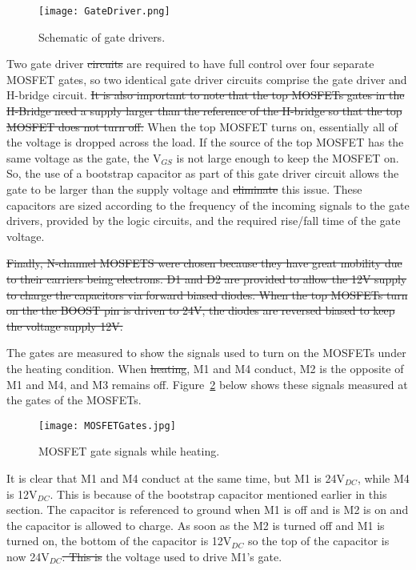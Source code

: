 \documentclass[11pt,letter]{article}
\providecommand{\DIFadd}[1]{{\protect\color{blue}\uwave{#1}}} %
\providecommand{\DIFdel}[1]{{\protect\color{red}\sout{#1}}}                      %
\providecommand{\DIFaddbegin}{} %
\providecommand{\DIFaddend}{} %
\providecommand{\DIFdelbegin}{} %
\providecommand{\DIFdelend}{} %
\newcommand{\DIFscaledelfig}{0.5}
\newlength{\DIFdelgraphicswidth} %
\newlength{\DIFdelgraphicsheight} %
\newcommand{\DIFaddincludegraphics}[2][]{{\color{blue}\fbox{\DIFOincludegraphics[#1]{#2}}}} %
\newcommand{\DIFdelincludegraphics}[2][]{%
\sbox{\DIFdelgraphicsbox}{\DIFOincludegraphics[#1]{#2}}%
\settoboxwidth{\DIFdelgraphicswidth}{\DIFdelgraphicsbox} %
\settoboxtotalheight{\DIFdelgraphicsheight}{\DIFdelgraphicsbox} %
\scalebox{\DIFscaledelfig}{%
\parbox[b]{\DIFdelgraphicswidth}{\usebox{\DIFdelgraphicsbox}\\[-\baselineskip] \rule{\DIFdelgraphicswidth}{0em}}\llap{\resizebox{\DIFdelgraphicswidth}{\DIFdelgraphicsheight}{%
\setlength{\unitlength}{\DIFdelgraphicswidth}%
\begin{picture}(1,1)%
\thicklines\linethickness{2pt} %
{\color[rgb]{1,0,0}\put(0,0){\framebox(1,1){}}}%
{\color[rgb]{1,0,0}\put(0,0){\line( 1,1){1}}}%
{\color[rgb]{1,0,0}\put(0,1){\line(1,-1){1}}}%
\end{picture}%
}\hspace*{3pt}}} %
} %
\DeclareRobustCommand{\DIFaddbegin}{\DIFOaddbegin \let\includegraphics\DIFaddincludegraphics} %
\DeclareRobustCommand{\DIFaddend}{\DIFOaddend \let\includegraphics\DIFOincludegraphics} %
\DeclareRobustCommand{\DIFdelbegin}{\DIFOdelbegin \let\includegraphics\DIFdelincludegraphics} %
\DeclareRobustCommand{\DIFdelend}{\DIFOaddend \let\includegraphics\DIFOincludegraphics} %
\begin{document}
\begin{figure}[H]
    \centering
    \texttt{[image: GateDriver.png]}
    \caption{Schematic of gate drivers.}
    \label{fig:gatedrivers}
\end{figure}

Two gate driver \DIFdelbegin \DIFdel{circuits }\DIFdelend \DIFaddbegin \DIFadd{ICs }\DIFaddend are required to have full control over four separate MOSFET gates, so two identical gate driver circuits comprise the gate driver and H-bridge circuit. \DIFdelbegin \DIFdel{It is also important to note that the top MOSFETs gates in the H-Bridge need a supply larger than the reference of the H-bridge so that the top MOSFET does not turn off. }\DIFdelend When the top MOSFET turns on, essentially all of the voltage is dropped across the load. If the source of the top MOSFET has the same voltage as the gate, the V$_{GS}$ is not large enough to keep the MOSFET on. So, the use of a bootstrap capacitor as part of this gate driver circuit allows the gate to be larger than the supply voltage and \DIFdelbegin \DIFdel{eliminate }\DIFdelend \DIFaddbegin \DIFadd{eliminates }\DIFaddend this issue. These capacitors are sized according to the frequency of the incoming signals to the gate drivers, provided by the logic circuits, and the required rise/fall time of the gate voltage.

\DIFdelbegin \DIFdel{Finally, N-channel MOSFETS were chosen because they have great mobility due to their carriers being electrons. D1 and D2 are provided to allow the 12V supply to charge the capacitors via forward biased diodes. When the top MOSFETs turn on the the BOOST pin is driven to 24V, the diodes are reversed biased to keep the voltage supply 12V.
}%

\DIFdelend The gates are measured to show the signals used to turn on the MOSFETs under the heating condition. When \DIFdelbegin \DIFdel{heating}\DIFdelend \DIFaddbegin \DIFadd{the chamber is in heating mode}\DIFaddend , M1 and M4 conduct, M2 is the opposite of M1 and M4, and M3 remains off. Figure~\ref{fig:mosfetgates} below shows these signals measured at the gates of the MOSFETs.

\begin{figure}[H]
    \centering
    \texttt{[image: MOSFETGates.jpg]}
    \caption{MOSFET gate signals while heating.}
    \label{fig:mosfetgates}
\end{figure}

It is clear that M1 and M4 conduct at the same time, but M1 is 24V$_{DC}$, while M4 is 12V$_{DC}$. This is because of the bootstrap capacitor mentioned earlier in this section. The capacitor is referenced to ground when M1 is off and is M2 is on and the capacitor is allowed to charge. As soon as the M2 is turned off and M1 is turned on, the bottom of the capacitor is 12V$_{DC}$ so the top of the capacitor is now 24V$_{DC}$\DIFdelbegin \DIFdel{. This is }\DIFdelend \DIFaddbegin \DIFadd{, }\DIFaddend the voltage used to drive M1's gate.
\end{document}
